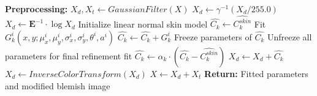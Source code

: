\begin{spacing}{1.5}
\begin{algorithm}
\begin{algorithmic}[1]
    \State \textbf{Preprocessing:}
        \State $X_d, X_t \gets GaussianFilter(X)$ 
        \State $X_d \gets \gamma^{-1}(X_d/255.0)$ 
        \State $X_d \gets \mathbf{E}^{-1}\cdot\log{X_d}$ 
        \State Initialize linear normal skin model $\hat{C_k}\gets\hat{C_k^{skin}}$
            \State Fit $G_k^i(x, y; \mu_x^i, \mu_y^i, \sigma_x^i, \sigma_y^i, \theta^i, a^i)$
            \State $\hat{C_k} \gets \hat{C_k}+G_k^i$
            \State Freeze parameters of $\hat{C_k}$
        \EndFor
        \State Unfreeze all parameters for final refinement fit
        \State $\hat{C_k} \gets \alpha_k\cdot(\hat{C_k}-\hat{C_k^{skin}})$
    \EndFor
    \State $X_d \gets X_d+\hat{C_k}$
    \State $X_d \gets InverseColorTransform(X_d)$
    \State $X \gets X_d+X_t$
    \State \textbf{Return:} Fitted parameters and modified blemish image
    \end{algorithmic}
    \end{algorithm}


\end{spacing}
